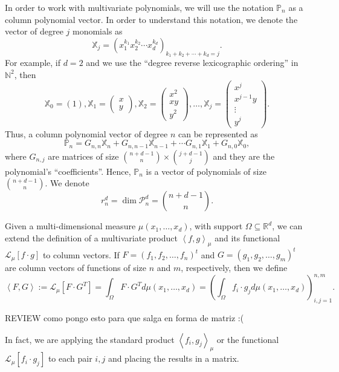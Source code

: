 \documentclass[12pt,a4]{article}
\theoremstyle{plain}
\newcommand{\R}[0]{\mathbb{R}}
\newcommand{\N}[0]{\mathbb{N}}
\newcommand{\cred}[1]{{\color{red} #1}}
\newcommand{\prodesc}[2]{\left\langle #1 , #2 \right\rangle}
\begin{document}
In order to work with multivariate polynomials, we will use the notation $\mathbb P_n$ as a column polynomial vector. In order to understand this notation, we denote the vector of degree $j$ monomials as
$$
\mathbb{X}_j = \left(x_1^{k_1} x_2^{k_2} \cdots x_d^{k_d}\right)_{k_1+k_2+\cdots +k_d = j}.
$$
For example, if $d=2$ and we use the ``degree reverse lexicographic ordering'' in $\N^2$, then
$$
\mathbb{X}_0=\left(1\right), \mathbb{X}_1=\begin{pmatrix}
    x \\ y
\end{pmatrix}, \mathbb{X}_2=\begin{pmatrix}
    x^2 \\ xy \\ y^2
\end{pmatrix}, \dots, \mathbb{X}_j=\begin{pmatrix}
    x^j \\ x^{j-1}y \\ \vdots \\ y^j
\end{pmatrix}.
$$
Thus, a column polynomial vector of degree $n$ can be represented as
$$
\mathbb{P}_n = G_{n,n}\mathbb{X}_n + G_{n,n-1}\mathbb{X}_{n-1}+\cdots G_{n,1}\mathbb{X}_1 + G_{n,0}\mathbb X_0,
$$
where $G_{n,j}$ are matrices of size $\binom{n+d-1}{n}\times\binom{j+d-1}{j}$ and they are the polynomial's ``coefficients''. Hence, $\mathbb P_n$ is a vector of polynomials of size $\binom{n+d-1}{n}$. We denote 
$$
r_n^d = \dim \mathcal{P}_n^d = \binom{n+d-1}{n}.
$$

Given a multi-dimensional measure $\mu(x_1,\dots,x_d)$, with support $\Omega\subseteq\R^d$, we can extend the definition of a multivariate product $\prodesc{f}{g}_\mu$ and its functional $\mathcal{L}_\mu[f\cdot g]$ to column vectors. If $F=(f_1,f_2,\dots,f_n)^t$ and $G=(g_1,g_2,\dots, g_m)^t$ are column vectors of functions of size $n$ and $m$, respectively, then we define
\begin{equation}
    \label{eq:prodesc-matrix}
    \prodesc{F}{G}:=\mathcal{L}_\mu[F\cdot G^T] = \int_\Omega F\cdot G^T d\mu(x_1,\dots,x_d) = \left(\int_\Omega f_i\cdot g_j d\mu(x_1,\dots,x_d)\right)_{i,j=1}^{n,m}.
\end{equation}

\cred{REVIEW como pongo esto para que salga en forma de matriz :(}

In fact, we are applying the standard product $\prodesc{f_i}{g_j}_\mu$ or the functional $\mathcal L_\mu[f_i\cdot g_j]$ to each pair $i,j$ and placing the results in a matrix.
\end{document}
